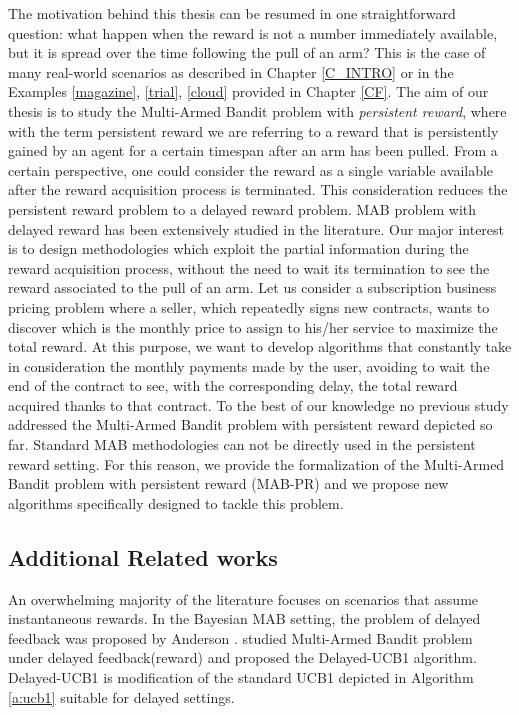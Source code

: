 The motivation behind this thesis can be resumed in one straightforward question: what happen when the reward is not a number immediately available, but it is spread over the time following the pull of an arm? This is the case of many real-world scenarios as described in Chapter \ref{C_INTRO} or in the Examples \ref{magazine}, \ref{trial}, \ref{cloud} provided in Chapter \ref{CF}. The aim of our thesis is to study the  Multi-Armed Bandit problem with \emph{persistent reward}, where with the term persistent reward we are referring to a reward that is persistently gained by an agent for a certain timespan after an arm has been pulled. From a certain perspective, one could consider the reward as a single variable available after the reward acquisition process is terminated. This consideration reduces the persistent reward problem to a delayed reward problem. MAB problem with delayed reward has been extensively studied in the literature. Our major interest is to design methodologies which exploit the partial information during the reward acquisition process, without the need to wait its termination to see the reward associated to the pull of an arm. Let us consider a subscription business pricing problem where a seller, which repeatedly signs new contracts, wants to discover which is the monthly price to assign to his/her service to maximize the total reward. At this purpose, we want to develop algorithms that constantly take in consideration the monthly payments made by the user, avoiding to wait the end of the contract to see, with the corresponding delay, the total reward acquired thanks to that contract. To the best of our knowledge no previous study addressed the Multi-Armed Bandit problem with persistent reward depicted so far. Standard MAB methodologies can not be directly used in the persistent reward setting. For this reason, we provide the formalization of the Multi-Armed Bandit problem with persistent reward (MAB-PR) and we propose new algorithms specifically designed to tackle this problem.

\subsection*{Additional Related works}
An overwhelming majority of the literature focuses on scenarios that assume instantaneous rewards.
In the Bayesian MAB setting, the problem of delayed feedback was proposed by Anderson \cite{Anderson1964}. \cite{joulani2013} studied Multi-Armed Bandit problem under delayed feedback(reward) and proposed the Delayed-UCB1 algorithm. Delayed-UCB1 is modification of the standard UCB1 depicted in Algorithm \ref{a:ucb1} suitable for delayed settings.


